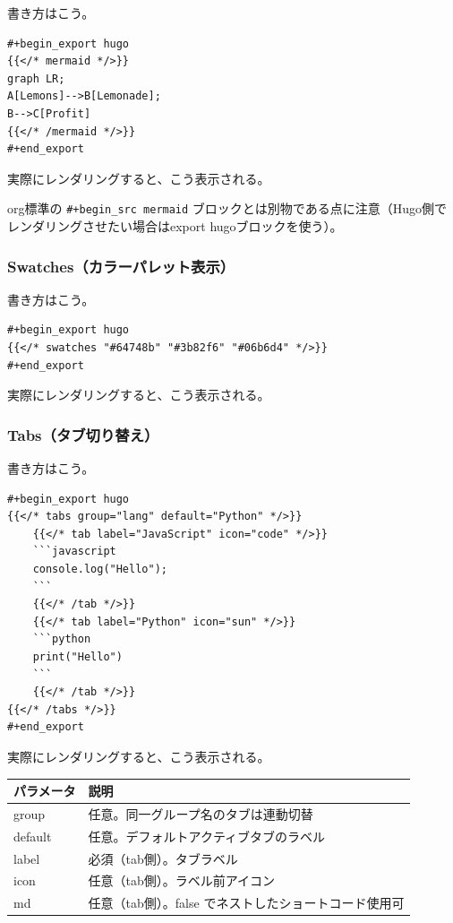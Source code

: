 \documentclass[11pt]{article}
\begin{document}
書き方はこう。

\begin{verbatim}
#+begin_export hugo
{{</* mermaid */>}}
graph LR;
A[Lemons]-->B[Lemonade];
B-->C[Profit]
{{</* /mermaid */>}}
#+end_export
\end{verbatim}

実際にレンダリングすると、こう表示される。

org標準の \texttt{\#+begin\_src mermaid} ブロックとは別物である点に注意（Hugo側でレンダリングさせたい場合はexport hugoブロックを使う）。
\subsubsection{Swatches（カラーパレット表示）}
\label{sec:orgf54a007}

書き方はこう。

\begin{verbatim}
#+begin_export hugo
{{</* swatches "#64748b" "#3b82f6" "#06b6d4" */>}}
#+end_export
\end{verbatim}

実際にレンダリングすると、こう表示される。
\subsubsection{Tabs（タブ切り替え）}
\label{sec:org416eedf}

書き方はこう。

\begin{verbatim}
#+begin_export hugo
{{</* tabs group="lang" default="Python" */>}}
    {{</* tab label="JavaScript" icon="code" */>}}
    ```javascript
    console.log("Hello");
    ```
    {{</* /tab */>}}
    {{</* tab label="Python" icon="sun" */>}}
    ```python
    print("Hello")
    ```
    {{</* /tab */>}}
{{</* /tabs */>}}
#+end_export
\end{verbatim}

実際にレンダリングすると、こう表示される。

\begin{center}
\begin{tabular}{ll}
パラメータ & 説明\\
\hline
group & 任意。同一グループ名のタブは連動切替\\
default & 任意。デフォルトアクティブタブのラベル\\
label & 必須（tab側）。タブラベル\\
icon & 任意（tab側）。ラベル前アイコン\\
md & 任意（tab側）。false でネストしたショートコード使用可\\
\end{tabular}
\end{center}
\end{document}
